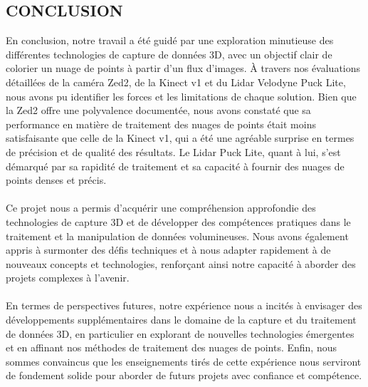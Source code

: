 \thispagestyle{empty} %
\begin{center}
    \section{\huge\textbf{{CONCLUSION}}}
\end{center}

\normalsize{
    En conclusion, notre travail a été guidé par une exploration minutieuse des différentes technologies de capture de données 3D, avec un objectif clair de colorier un nuage de points à partir d'un flux d'images. À travers nos évaluations détaillées de la caméra Zed2, de la Kinect v1 et du Lidar Velodyne Puck Lite, nous avons pu identifier les forces et les limitations de chaque solution. Bien que la Zed2 offre une polyvalence documentée, nous avons constaté que sa performance en matière de traitement des nuages de points était moins satisfaisante que celle de la Kinect v1, qui a été une agréable surprise en termes de précision et de qualité des résultats. Le Lidar Puck Lite, quant à lui, s'est démarqué par sa rapidité de traitement et sa capacité à fournir des nuages de points denses et précis.
}
\\ \\
\normalsize{
    Ce projet nous a permis d'acquérir une compréhension approfondie des technologies de capture 3D et de développer des compétences pratiques dans le traitement et la manipulation de données volumineuses. Nous avons également appris à surmonter des défis techniques et à nous adapter rapidement à de nouveaux concepts et technologies, renforçant ainsi notre capacité à aborder des projets complexes à l'avenir.
}
\\ \\
\normalsize{
    En termes de perspectives futures, notre expérience nous a incités à envisager des développements supplémentaires dans le domaine de la capture et du traitement de données 3D, en particulier en explorant de nouvelles technologies émergentes et en affinant nos méthodes de traitement des nuages de points. Enfin, nous sommes convaincus que les enseignements tirés de cette expérience nous serviront de fondement solide pour aborder de futurs projets avec confiance et compétence.
}

\clearpage